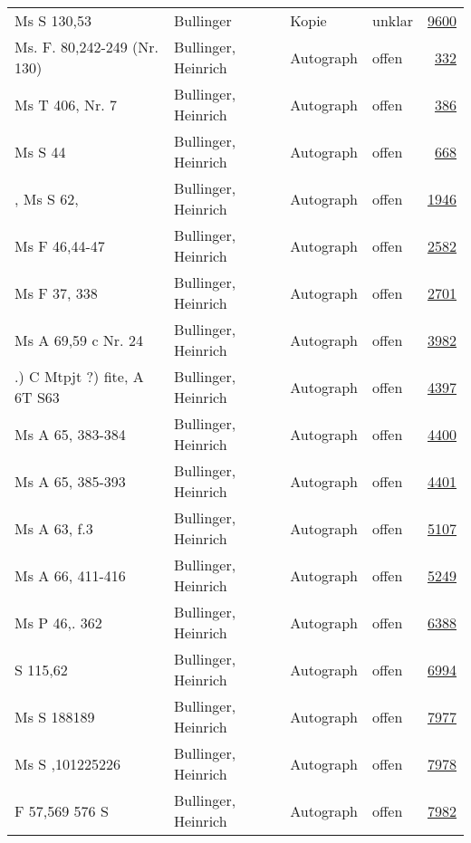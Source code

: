 \documentclass[10pt,a4paper,landscape]{report}
\begin{document}
\begin{longtable}{p{16cm}p{4cm}llr}
Ms S 130,53	&	Bullinger	&	Kopie	&	unklar	&	\href{http://130.60.24.72/assignment/9600}{9600}\\
Ms. F. 80,242-249 (Nr. 130)	&	Bullinger, Heinrich	&	Autograph	&	offen	&	\href{http://130.60.24.72/assignment/332}{332}\\
Ms T 406, Nr. 7	&	Bullinger, Heinrich	&	Autograph	&	offen	&	\href{http://130.60.24.72/assignment/386}{386}\\
Ms S 44	&	Bullinger, Heinrich	&	Autograph	&	offen	&	\href{http://130.60.24.72/assignment/668}{668}\\
, Ms S 62,	&	Bullinger, Heinrich	&	Autograph	&	offen	&	\href{http://130.60.24.72/assignment/1946}{1946}\\
Ms F 46,44-47	&	Bullinger, Heinrich	&	Autograph	&	offen	&	\href{http://130.60.24.72/assignment/2582}{2582}\\
Ms F 37, 338	&	Bullinger, Heinrich	&	Autograph	&	offen	&	\href{http://130.60.24.72/assignment/2701}{2701}\\
Ms A 69,59 c Nr. 24	&	Bullinger, Heinrich	&	Autograph	&	offen	&	\href{http://130.60.24.72/assignment/3982}{3982}\\
.) C Mtpjt ?) fite, A 6T S63	&	Bullinger, Heinrich	&	Autograph	&	offen	&	\href{http://130.60.24.72/assignment/4397}{4397}\\
Ms A 65, 383-384	&	Bullinger, Heinrich	&	Autograph	&	offen	&	\href{http://130.60.24.72/assignment/4400}{4400}\\
Ms A 65, 385-393	&	Bullinger, Heinrich	&	Autograph	&	offen	&	\href{http://130.60.24.72/assignment/4401}{4401}\\
Ms A 63, f.3	&	Bullinger, Heinrich	&	Autograph	&	offen	&	\href{http://130.60.24.72/assignment/5107}{5107}\\
Ms A 66, 411-416	&	Bullinger, Heinrich	&	Autograph	&	offen	&	\href{http://130.60.24.72/assignment/5249}{5249}\\
Ms P 46,. 362	&	Bullinger, Heinrich	&	Autograph	&	offen	&	\href{http://130.60.24.72/assignment/6388}{6388}\\
S 115,62	&	Bullinger, Heinrich	&	Autograph	&	offen	&	\href{http://130.60.24.72/assignment/6994}{6994}\\
Ms S 188189	&	Bullinger, Heinrich	&	Autograph	&	offen	&	\href{http://130.60.24.72/assignment/7977}{7977}\\
Ms S ,101225226	&	Bullinger, Heinrich	&	Autograph	&	offen	&	\href{http://130.60.24.72/assignment/7978}{7978}\\
F 57,569 576 S	&	Bullinger, Heinrich	&	Autograph	&	offen	&	\href{http://130.60.24.72/assignment/7982}{7982}\\

\end{longtable}
\end{document}
